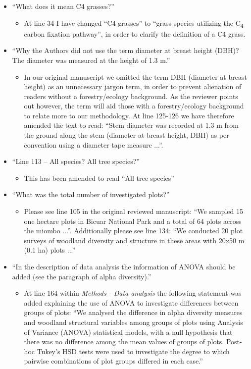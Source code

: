 \documentclass[a4paper]{letter}
\begin{document}
\begin{letter}{}
\begin{itemize}
\begin{itemize}
		\end{itemize}
	\item{``What does it mean C4 grasses?''}
		\begin{itemize}
			\item{At line 34 I have changed ``C4 grasses'' to ``grass species utilizing the C\textsubscript{4} carbon fixation pathway'', in order to clarify the definition of a C4 grass.}
		\end{itemize}
	\item{``Why the Authors did not use the term diameter at breast height (DBH)? The diameter was measured at the height of 1.3 m.''}
		\begin{itemize}
			\item{In our original manuscript we omitted the term DBH (diameter at breast height) as an unnecessary jargon term, in order to prevent alienation of readers without a forestry/ecology background. As the reviewer points out however, the term will aid those with a forestry/ecology background to relate more to our methodology. At line 125-126 we have therefore amended the text to read: ``Stem diameter was recorded at 1.3 m from the ground along the stem (diameter at breast height, DBH) as per convention using a diameter tape measure ...''.}
		\end{itemize}
	\item{``Line 113 – All species? All tree species?''}
		\begin{itemize}
			\item{This has been amended to read ``All tree species''}
		\end{itemize}
	\item{``What was the total number of investigated plots?''}
		\begin{itemize}
			\item{Please see line 105 in the original reviewed manuscript: ``We sampled 15 one hectare plots in Bicuar National Park and a total of 64 plots across the miombo ...''. Additionally please see line 134: ``We conducted 20 plot surveys of woodland diversity and structure in these areas with 20x50 m (0.1 ha) plots ...''}
		\end{itemize}
	\item{``In the description of data analysis the information of ANOVA should be added (see the paragraph of alpha diversity).''}
		\begin{itemize}
			\item{At line 164 within \textit{Methods - Data analysis} the following statement was added explaining the use of ANOVA to investigate differences between groups of plots: ``We analysed the difference in alpha diversity measures and woodland structural variables among groups of plots using Analysis of Variance (ANOVA) statistical models, with a null hypothesis that there was no difference among the mean values of groups of plots. Post-hoc Tukey's HSD tests were used to investigate the degree to which pairwise combinations of plot groups differed in each case.''}

\end{itemize}
\end{itemize}
\end{letter}
\end{document}
